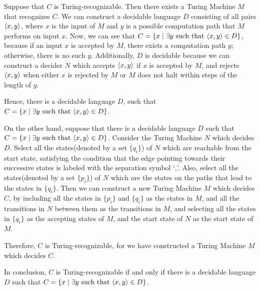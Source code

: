 \documentclass{homework}
\begin{document}
\begin{solution}

  Suppose that $C$ is Turing-recognizable.
  Then there exists a Turing Machine $M$ that recognizes $C$.
  We can construct a decidable language $D$ consisting of all pairs $\langle x,y\rangle$,
  where $x$ is the input of $M$ and $y$ is a possible computation path that
  $M$ performs on input $x$.
  Now, we can see that $C = \{ x \mid \exists y \text{ such that } \langle x,y\rangle \in D\}$,
  because if an input $x$ is accepted by $M$,
  there exists a computation path $y$; otherwise, there is no such $y$.
  Additionally, $D$ is decidable because we can construct a decider $N$
  which accepts $\langle x,y\rangle$ if $x$ is accepted by $M$,
  and rejects $\langle x,y\rangle$ when either $x$ is rejected by $M$
  or $M$ does not halt within steps of the length of $y$.

  Hence, there is a decidable language $D$, such that
  $C = \{ x \mid \exists y \text{ such that } \langle x,y\rangle \in D\}$.

  On the other hand, suppose that there is a decidable language $D$
  such that $C = \{ x \mid \exists y \text{ such that } \langle x,y\rangle \in D\}$.
  Consider the Turing Machine $N$ which decides $D$.
  Select all the states(denoted by a set $\{q_i\}$) of $N$
  which are reachable from the start state,
  satisfying the condition that the edge pointing towards their successive states
  is labeled with the separation symbol `,'.
  Also, select all the states(denoted by a set $\{p_i\}$) of $N$
  which are the states on the paths that lead to the states in $\{q_i\}$.
  Then we can construct a new Turing Machine $M$ which decides $C$,
  by including all the states in $\{p_i\}$ and $\{q_i\}$ as the states in $M$,
  and all the transitions in $N$ between them as the transitions in $M$,
  and selecting all the states in $\{q_i\}$ as the accepting states of $M$,
  and the start state of $N$ as the start state of $M$.

  Therefore, $C$ is Turing-recognizable,
  for we have constructed a Turing Machine $M$ which decides $C$.

  In conclusion,
  $C$ is Turing-recognizable if and only if there is a decidable language $D$
  such that $C = \{ x \mid \exists y \text{ such that } \langle x,y\rangle \in D\}$.

\end{solution}
\end{document}
